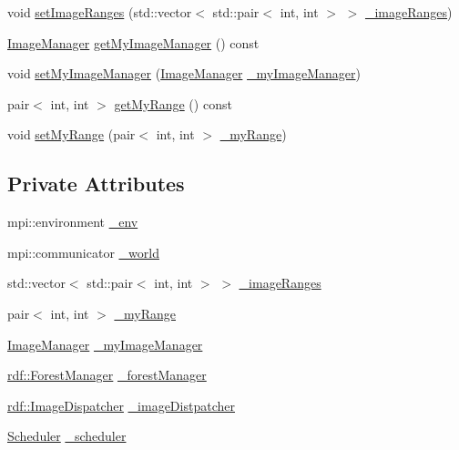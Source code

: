\begin{DoxyCompactItemize}
\item 
void \hyperlink{classrdf_1_1DistributionManager_a3545e401850b0263252d07c815220b13}{set\+Image\+Ranges} (std\+::vector$<$ std\+::pair$<$ int, int $>$ $>$ \hyperlink{classrdf_1_1DistributionManager_a5f3f6245bed7bfcf34204fc16e655656}{\+\_\+image\+Ranges})
\item 
\hyperlink{classImageManager}{Image\+Manager} \hyperlink{classrdf_1_1DistributionManager_a264664d495909f826523699558d4f8e4}{get\+My\+Image\+Manager} () const 
\item 
void \hyperlink{classrdf_1_1DistributionManager_aebde88548a718fc7b984ff356abebd27}{set\+My\+Image\+Manager} (\hyperlink{classImageManager}{Image\+Manager} \hyperlink{classrdf_1_1DistributionManager_aa265ab894795aa960fdcc67f0934934f}{\+\_\+my\+Image\+Manager})
\item 
pair$<$ int, int $>$ \hyperlink{classrdf_1_1DistributionManager_a5fcb2947236b8109c575215c15b55791}{get\+My\+Range} () const 
\item 
void \hyperlink{classrdf_1_1DistributionManager_a8c137d7196f9876c9079f7ef7a9dd8f5}{set\+My\+Range} (pair$<$ int, int $>$ \hyperlink{classrdf_1_1DistributionManager_ac6e764a519add6afff6ba14e09e45cfa}{\+\_\+my\+Range})
\end{DoxyCompactItemize}
\subsection*{Private Attributes}
\begin{DoxyCompactItemize}
\item 
mpi\+::environment \hyperlink{classrdf_1_1DistributionManager_ab24e19df5707be063ee48ef9f41af13f}{\+\_\+env}
\item 
mpi\+::communicator \hyperlink{classrdf_1_1DistributionManager_ac8a061176717baf96b2913cd22dcbf20}{\+\_\+world}
\item 
std\+::vector$<$ std\+::pair$<$ int, int $>$ $>$ \hyperlink{classrdf_1_1DistributionManager_a5f3f6245bed7bfcf34204fc16e655656}{\+\_\+image\+Ranges}
\item 
pair$<$ int, int $>$ \hyperlink{classrdf_1_1DistributionManager_ac6e764a519add6afff6ba14e09e45cfa}{\+\_\+my\+Range}
\item 
\hyperlink{classImageManager}{Image\+Manager} \hyperlink{classrdf_1_1DistributionManager_aa265ab894795aa960fdcc67f0934934f}{\+\_\+my\+Image\+Manager}
\item 
\hyperlink{classrdf_1_1ForestManager}{rdf\+::\+Forest\+Manager} \hyperlink{classrdf_1_1DistributionManager_aba2daa8780c7915f9f1a5d871edb93c9}{\+\_\+forest\+Manager}
\item 
\hyperlink{classrdf_1_1ImageDispatcher}{rdf\+::\+Image\+Dispatcher} \hyperlink{classrdf_1_1DistributionManager_a43d6497690b1040281e7dfd64ed4dc65}{\+\_\+image\+Distpatcher}
\item 
\hyperlink{classScheduler}{Scheduler} \hyperlink{classrdf_1_1DistributionManager_a6a628c16669a4c94837597193fa95ecb}{\+\_\+scheduler}
\end{DoxyCompactItemize}


